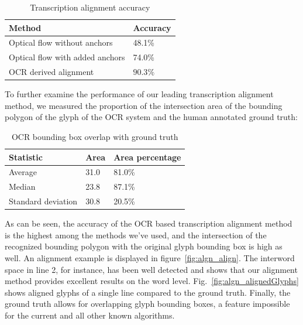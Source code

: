 
\begin{table}[h!]
\begin{center}
	\begin{tabularx}{0.5\textwidth}{Xl} \toprule
Method& Accuracy\\\midrule
Optical flow without anchors&48.1\%\\
Optical flow with added anchors&74.0\%\\
OCR derived alignment & $\mathbf{90.3\%}$\\ \bottomrule
\end{tabularx}
\caption{Transcription alignment accuracy}
\label{tab:algn_tab1}
\end{center}
\end{table}

To further examine the performance of our leading transcription alignment
method, we measured the proportion of the intersection area of the bounding
polygon of the glyph of the OCR system and the human annotated ground truth: 


\begin{table}[h!]
\begin{center}
\begin{tabularx}{0.5\textwidth}{Xll}
\toprule
Statistic & Area & Area percentage\\\midrule
Average&31.0&81.0\%\\
Median&23.8&87.1\%\\ 
Standard deviation&30.8&20.5\%\\ \bottomrule
\end{tabularx} 
\caption{OCR bounding box overlap with ground truth}
\label{tab:algn_tab2}
\end{center}
\end{table}

As can be seen, the accuracy of the OCR based transcription alignment method is
the highest among the methods we've used, and the intersection of the
recognized bounding polygon with the original glyph bounding box is high as
well.  An alignment example is displayed in figure~\ref{fig:algn_align}.  The
interword space in line 2, for instance, has been well detected and shows that
our alignment method provides excellent results on the word level.
Fig.~\ref{fig:algn_alignedGlyphs} shows aligned glyphs of a single line compared to
the ground truth.  Finally, the ground truth allows for overlapping glyph
bounding boxes, a feature impossible for the current and all other known
algorithms.

